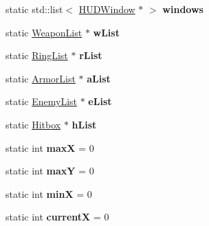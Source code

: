 \begin{DoxyCompactItemize}
\item 
\hypertarget{class_game_afa3edaf9ec297d522ea19cd48c77a53a}{static std\+::list$<$ \hyperlink{class_h_u_d_window}{H\+U\+D\+Window} $\ast$ $>$ {\bfseries windows}}\label{class_game_afa3edaf9ec297d522ea19cd48c77a53a}

\item 
\hypertarget{class_game_afa1de8c59db49bc9239f6bb87465351b}{static \hyperlink{class_weapon_list}{Weapon\+List} $\ast$ {\bfseries w\+List}}\label{class_game_afa1de8c59db49bc9239f6bb87465351b}

\item 
\hypertarget{class_game_ac0f51cf0b2dcf5447cd2e7b3fe2d4c71}{static \hyperlink{class_ring_list}{Ring\+List} $\ast$ {\bfseries r\+List}}\label{class_game_ac0f51cf0b2dcf5447cd2e7b3fe2d4c71}

\item 
\hypertarget{class_game_a8d148d1b848a1386ca7dc51552789d07}{static \hyperlink{class_armor_list}{Armor\+List} $\ast$ {\bfseries a\+List}}\label{class_game_a8d148d1b848a1386ca7dc51552789d07}

\item 
\hypertarget{class_game_aeda7eafecf64b67137b97698ffd2dc51}{static \hyperlink{class_enemy_list}{Enemy\+List} $\ast$ {\bfseries e\+List}}\label{class_game_aeda7eafecf64b67137b97698ffd2dc51}

\item 
\hypertarget{class_game_a5625cb138092a97f084bd65c0e0af173}{static \hyperlink{class_hitbox}{Hitbox} $\ast$ {\bfseries h\+List}}\label{class_game_a5625cb138092a97f084bd65c0e0af173}

\item 
\hypertarget{class_game_a554200621d77a78495bc21f4d2154e2d}{static int {\bfseries max\+X} = 0}\label{class_game_a554200621d77a78495bc21f4d2154e2d}

\item 
\hypertarget{class_game_a416a5bd8a9fd3fa3ffab9090e26cde4f}{static int {\bfseries max\+Y} = 0}\label{class_game_a416a5bd8a9fd3fa3ffab9090e26cde4f}

\item 
\hypertarget{class_game_aae762376e5783712891ce3fd0ce10bb5}{static int {\bfseries min\+X} = 0}\label{class_game_aae762376e5783712891ce3fd0ce10bb5}

\item 
\hypertarget{class_game_a259c7500e0604b452a1771b0335fe32c}{static int {\bfseries current\+X} = 0}\label{class_game_a259c7500e0604b452a1771b0335fe32c}


\end{DoxyCompactItemize}
